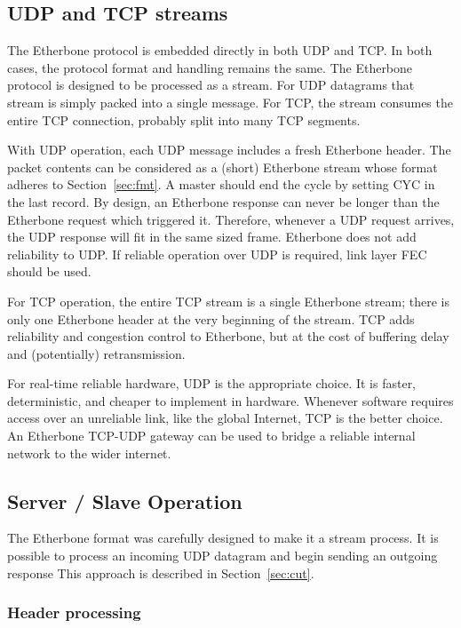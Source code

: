 \documentclass{article}
\begin{document}
\subsection{UDP and TCP streams}

The Etherbone protocol is embedded directly in both UDP and TCP.
In both cases, the protocol format and handling remains the same.
The Etherbone protocol is designed to be processed as a stream.
For UDP datagrams that stream is simply packed into a single message.
For TCP, the stream consumes the entire TCP connection,
probably split into many TCP segments.

With UDP operation,
each UDP message includes a fresh Etherbone header.
The packet contents can be considered as a (short) Etherbone stream
whose format adheres to Section~\ref{sec:fmt}.
A master should end the cycle by setting CYC in the last record.
By design,
an Etherbone response can never be longer than the Etherbone request
which triggered it.
Therefore, whenever a UDP request arrives, 
the UDP response will fit in the same sized frame.
Etherbone does not add reliability to UDP.
If reliable operation over UDP is required, 
link layer FEC should be used.

For TCP operation,
the entire TCP stream is a single Etherbone stream;
there is only one Etherbone header at the very beginning of the stream.
TCP adds reliability and congestion control to Etherbone,
but at the cost of buffering delay
and (potentially) retransmission.

For real-time reliable hardware, UDP is the appropriate choice.
It is faster, deterministic, and cheaper to implement in hardware.
Whenever software requires access over an unreliable link,
like the global Internet,
TCP is the better choice.
An Etherbone TCP-UDP gateway can be used
to bridge a reliable internal network to the wider internet.

\subsection{Server / Slave Operation}

The Etherbone format was carefully designed to make it a stream process.
It is possible to process an incoming UDP datagram and
begin sending an outgoing response 
This approach is described in Section~\ref{sec:cut}.

\subsubsection{Header processing}
\end{document}
